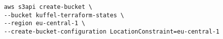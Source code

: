 \lstset{language=bash}
\begin{lstlisting}[frame=htrbl, caption={Terraform S3 Bucket Backend}, label={lst:terraform_s3_backend}]
aws s3api create-bucket \
--bucket kuffel-terraform-states \
--region eu-central-1 \
--create-bucket-configuration LocationConstraint=eu-central-1
\end{lstlisting}